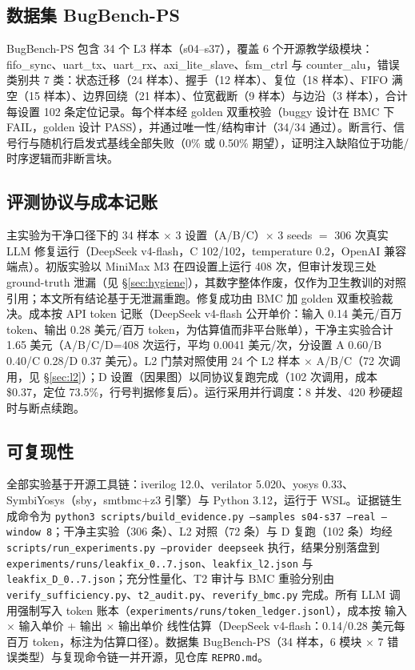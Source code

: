 \documentclass[journal]{IEEEtran}
\begin{document}
\subsection{数据集 BugBench-PS}

BugBench-PS 包含 34 个 L3 样本（s04--s37），覆盖 6 个开源教学级模块：fifo\_sync、uart\_tx、uart\_rx、axi\_lite\_slave、fsm\_ctrl 与 counter\_alu，错误类别共 7 类：状态迁移（24 样本）、握手（12 样本）、复位（18 样本）、FIFO 满空（15 样本）、边界回绕（21 样本）、位宽截断（9 样本）与边沿（3 样本），合计每设置 102 条定位记录。每个样本经 golden 双重校验（buggy 设计在 BMC 下 FAIL，golden 设计 PASS），并通过唯一性/结构审计（34/34 通过）。断言行、信号行与随机行启发式基线全部失败（0\% 或 0.50\% 期望），证明注入缺陷位于功能/时序逻辑而非断言块。

\subsection{评测协议与成本记账}

主实验为干净口径下的 34 样本 $\times$ 3 设置（A/B/C）$\times$ 3 seeds $=$ 306 次真实 LLM 修复运行（DeepSeek v4-flash，C 102/102，temperature 0.2，OpenAI 兼容端点）。初版实验以 MiniMax M3 在四设置上运行 408 次，但审计发现三处 ground-truth 泄漏（见 \S\ref{sec:hygiene}），其数字整体作废，仅作为卫生教训的对照引用；本文所有结论基于无泄漏重跑。修复成功由 BMC 加 golden 双重校验裁决。成本按 API token 记账（DeepSeek v4-flash 公开单价：输入 0.14 美元/百万 token、输出 0.28 美元/百万 token，为估算值而非平台账单），干净主实验合计 1.65 美元（A/B/C/D=408 次运行，平均 0.0041 美元/次，分设置 A 0.60/B 0.40/C 0.28/D 0.37 美元）。L2 门禁对照使用 24 个 L2 样本 $\times$ A/B/C（72 次调用，见 \S\ref{sec:l2}）；D 设置（因果图）以同协议复跑完成（102 次调用，成本 \$0.37，定位 73.5\%，行号判据修复后）。运行采用并行调度：8 并发、420 秒硬超时与断点续跑。


\subsection{可复现性}

全部实验基于开源工具链：iverilog 12.0、verilator 5.020、yosys 0.33、SymbiYosys（sby，smtbmc+z3 引擎）与 Python 3.12，运行于 WSL。证据链生成命令为 \texttt{python3 scripts/build\_evidence.py --samples s04-s37 --real --window 8}；干净主实验（306 条）、L2 对照（72 条）与 D 复跑（102 条）均经 \texttt{scripts/run\_experiments.py --provider deepseek} 执行，结果分别落盘到 \texttt{experiments/runs/leakfix\_0..7.json}、\texttt{leakfix\_l2.json} 与 \texttt{leakfix\_D\_0..7.json}；充分性量化、T2 审计与 BMC 重验分别由 \texttt{verify\_sufficiency.py}、\texttt{t2\_audit.py}、\texttt{reverify\_bmc.py} 完成。所有 LLM 调用强制写入 token 账本（\texttt{experiments/runs/token\_ledger.jsonl}），成本按 输入 $\times$ 输入单价 + 输出 $\times$ 输出单价 线性估算（DeepSeek v4-flash：0.14/0.28 美元每百万 token，标注为估算口径）。数据集 BugBench-PS（34 样本，6 模块 $\times$ 7 错误类型）与复现命令链一并开源，见仓库 \texttt{REPRO.md}。
\end{document}
